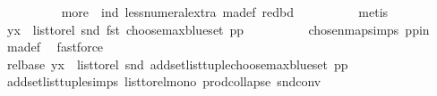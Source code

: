 \begin{isabellebody}
\ \ \ \ \ \ \ \ \isamarkupfalse%
\ more\ {}\ ind\ less{\isacharunderscore}{\kern0pt}numeral{\isacharunderscore}{\kern0pt}extra{\isacharparenleft}{\kern0pt}{}{\isacharparenright}{\kern0pt}\ ma{\isacharunderscore}{\kern0pt}def\ red{\isacharunderscore}{\kern0pt}bd\isanewline
\ \ \ \ \ \ \ \ \isamarkupfalse%
\ {\isacharparenleft}{\kern0pt}metis{\isacharparenright}{\kern0pt}\isanewline
\ \ \ \ \ \ \isamarkupfalse%
\ \isamarkupfalse%
\ {\isachardoublequoteopen}{\isacharparenleft}{\kern0pt}y{\isacharcomma}{\kern0pt}x{\isacharparenright}{\kern0pt}\ {\isasymin}\ list{\isacharunderscore}{\kern0pt}to{\isacharunderscore}{\kern0pt}rel\ {\isacharparenleft}{\kern0pt}snd\ {\isacharparenleft}{\kern0pt}fst\ {\isacharparenleft}{\kern0pt}choose{\isacharunderscore}{\kern0pt}max{\isacharunderscore}{\kern0pt}blue{\isacharunderscore}{\kern0pt}set\ pp{\isacharparenright}{\kern0pt}{\isacharparenright}{\kern0pt}{\isacharparenright}{\kern0pt}{\isachardoublequoteclose}\isanewline
\ \ \ \ \ \ \ \ \isamarkupfalse%
\ chosen{\isacharunderscore}{\kern0pt}map{\isacharunderscore}{\kern0pt}simps{\isacharparenleft}{\kern0pt}{}{\isacharparenright}{\kern0pt}\ pp{\isacharunderscore}{\kern0pt}in\ {}\ \isamarkupfalse%
\ ma{\isacharunderscore}{\kern0pt}def\ \isamarkupfalse%
\ fastforce\isanewline
\ \ \ \ \ \ \isamarkupfalse%
\ \isamarkupfalse%
\ rel{\isacharunderscore}{\kern0pt}base{\isacharcolon}{\kern0pt}\ {\isachardoublequoteopen}{\isacharparenleft}{\kern0pt}y{\isacharcomma}{\kern0pt}x{\isacharparenright}{\kern0pt}\ {\isasymin}\ list{\isacharunderscore}{\kern0pt}to{\isacharunderscore}{\kern0pt}rel\ {\isacharparenleft}{\kern0pt}snd\ {\isacharparenleft}{\kern0pt}add{\isacharunderscore}{\kern0pt}set{\isacharunderscore}{\kern0pt}list{\isacharunderscore}{\kern0pt}tuple{\isacharparenleft}{\kern0pt}choose{\isacharunderscore}{\kern0pt}max{\isacharunderscore}{\kern0pt}blue{\isacharunderscore}{\kern0pt}set\ pp{\isacharparenright}{\kern0pt}{\isacharparenright}{\kern0pt}{\isacharparenright}{\kern0pt}{\isachardoublequoteclose}\isanewline
\ \ \ \ \ \ \ \ \isamarkupfalse%
\ add{\isacharunderscore}{\kern0pt}set{\isacharunderscore}{\kern0pt}list{\isacharunderscore}{\kern0pt}tuple{\isachardot}{\kern0pt}simps\ list{\isacharunderscore}{\kern0pt}to{\isacharunderscore}{\kern0pt}rel{\isacharunderscore}{\kern0pt}mono\ prod{\isachardot}{\kern0pt}collapse\ snd{\isacharunderscore}{\kern0pt}conv\isanewline

\end{isabellebody}
